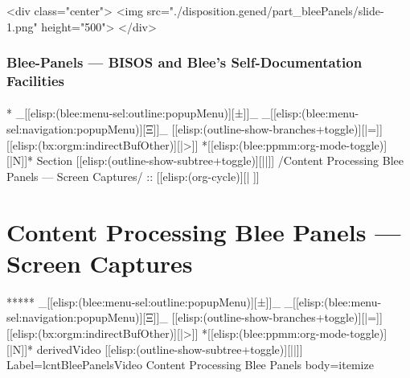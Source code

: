 \begin{whenOrg}
\begin{htmlonly}

\begin{frame}[fragile,plain,label=part_bleePanels]
    \frametitle{}
    \framesubtitle{}
    \begin{rawhtml}
<div class="center">
<img src="./disposition.gened/part_bleePanels/slide-1.png" height="500">
</div>
    \end{rawhtml}
\end{frame}
\end{htmlonly}

\begin{verblatex}

\begin{frame}[fragile,label=part_bleePanels]
    \frametitle{Blee-Panels --- BISOS and Blee's Self-Documentation Facilities}
    \framesubtitle{}

    \tableofcontents

\end{frame}
\end{verblatex}


\begin{whenOrg}
*  _[[elisp:(blee:menu-sel:outline:popupMenu)][±]]_ _[[elisp:(blee:menu-sel:navigation:popupMenu)][Ξ]]_ [[elisp:(outline-show-branches+toggle)][|=]] [[elisp:(bx:orgm:indirectBufOther)][|>]] *[[elisp:(blee:ppmm:org-mode-toggle)][|N]]*  Section    [[elisp:(outline-show-subtree+toggle)][||]]   /Content Processing Blee Panels --- Screen Captures/ ::  [[elisp:(org-cycle)][| ]]
\end{whenOrg}

\section{Content Processing Blee Panels --- Screen Captures}

\begin{whenOrg}
*****  _[[elisp:(blee:menu-sel:outline:popupMenu)][±]]_ _[[elisp:(blee:menu-sel:navigation:popupMenu)][Ξ]]_ [[elisp:(outline-show-branches+toggle)][|=]] [[elisp:(bx:orgm:indirectBufOther)][|>]] *[[elisp:(blee:ppmm:org-mode-toggle)][|N]]*  derivedVideo [[elisp:(outline-show-subtree+toggle)][||]] Label=lcntBleePanelsVideo Content Processing Blee Panels body=itemize
\end{whenOrg}


\end{whenOrg}
